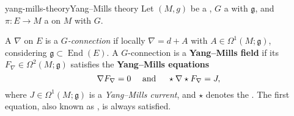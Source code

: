 \begin{topic}{yang-mills-theory}{Yang--Mills theory}
    Let $(M, g)$ be a , $G$ a  with  $\mathfrak{g}$, and $\pi \colon E \to M$ a  on $M$ with  $G$.

    A  $\nabla$ on $E$ is a \textit{$G$-connection} if locally $\nabla = d + A$ with $A \in \Omega^1(M; \mathfrak{g})$, considering $\mathfrak{g} \subset \operatorname{End}(E)$. A $G$-connection is a \textbf{Yang--Mills field} if its  $F_\nabla \in \Omega^2(M; \mathfrak{g})$ satisfies the \textbf{Yang--Mills equations}
    \[ \nabla F_\nabla = 0 \quad \textup{ and } \quad \star \nabla \star F_\nabla = J , \]
    where $J \in \Omega^1(M; \mathfrak{g})$ is a \textit{Yang--Mills current}, and $\star$ denotes the . The first equation, also known as , is always satisfied.
\end{topic}

